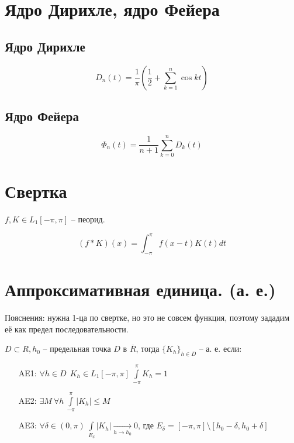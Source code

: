 \documentclass[paper=a4, fontsize=14pt]{report}
\begin{document}
	\begin{center}
	\end{center}

	\section{Ядро Дирихле, ядро Фейера}

	\subsection{Ядро Дирихле}

	$$ D_n(t) = \frac{1}{\pi}( \frac{1}{2} + \sum_{k = 1}^{n} \cos kt) $$

	\subsection{Ядро Фейера}

	$$ \Phi_n(t) = \frac{1}{n+1} \sum_{k = 0}^{n} D_k(t) $$

	\section{Свертка}

	$ f, K \in L_1[-\pi, \pi]$  -- пеорид.

	$$ (f \ast K)(x) = \int_{-\pi}^{\pi} f(x-t)K(t) dt$$

    \section{Аппроксимативная единица. (а. е.)}
        
        Пояснения: нужна 1-ца по свертке, но это не совсем функция, поэтому зададим её как предел последовательности.
        
        $ D \subset R, h_0 $ -- предельная точка $ D $ в $ \overline{R} $, 
        тогда $ \{K_h\}_{h \in D}$ -- а. е. если:
        \begin{itemize}
            \item[AE1: ] $ \forall h \in D ~~ K_h \in L_1[-\pi, \pi] ~ \int\limits_{-\pi}^{\pi} K_h = 1 $
            \item[AE2: ] $ \exists M ~ \forall h ~ \int\limits_{-\pi}^{\pi} |K_h| \leq M $
            \item[AE3: ] $ \forall \delta \in (0, \pi) ~  \int\limits_{E_\delta} | K_h | 
            \underset{h \rightarrow h_0}{\rightarrow} 0  $, где $E_{\delta} = [-\pi,\pi] \setminus [h_0 - \delta, h_0 + \delta]$
        \end{itemize}
        
\end{document}
